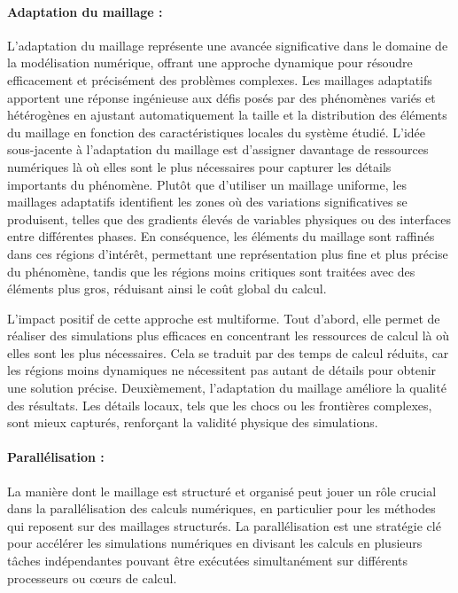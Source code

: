 \paragraph{Adaptation du maillage :}

L'adaptation du maillage représente une avancée significative dans le domaine de la modélisation numérique, offrant une approche dynamique pour résoudre efficacement et précisément des problèmes complexes. Les maillages adaptatifs apportent une réponse ingénieuse aux défis posés par des phénomènes variés et hétérogènes en ajustant automatiquement la taille et la distribution des éléments du maillage en fonction des caractéristiques locales du système étudié. L'idée sous-jacente à l'adaptation du maillage est d'assigner davantage de ressources numériques là où elles sont le plus nécessaires pour capturer les détails importants du phénomène. Plutôt que d'utiliser un maillage uniforme, les maillages adaptatifs identifient les zones où des variations significatives se produisent, telles que des gradients élevés de variables physiques ou des interfaces entre différentes phases. En conséquence, les éléments du maillage sont raffinés dans ces régions d'intérêt, permettant une représentation plus fine et plus précise du phénomène, tandis que les régions moins critiques sont traitées avec des éléments plus gros, réduisant ainsi le coût global du calcul.

L'impact positif de cette approche est multiforme. Tout d'abord, elle permet de réaliser des simulations plus efficaces en concentrant les ressources de calcul là où elles sont les plus nécessaires. Cela se traduit par des temps de calcul réduits, car les régions moins dynamiques ne nécessitent pas autant de détails pour obtenir une solution précise. Deuxièmement, l'adaptation du maillage améliore la qualité des résultats. Les détails locaux, tels que les chocs ou les frontières complexes, sont mieux capturés, renforçant la validité physique des simulations.

\paragraph{Parallélisation :}

La manière dont le maillage est structuré et organisé peut jouer un rôle crucial dans la parallélisation des calculs numériques, en particulier pour les méthodes qui reposent sur des maillages structurés. La parallélisation est une stratégie clé pour accélérer les simulations numériques en divisant les calculs en plusieurs tâches indépendantes pouvant être exécutées simultanément sur différents processeurs ou cœurs de calcul.

